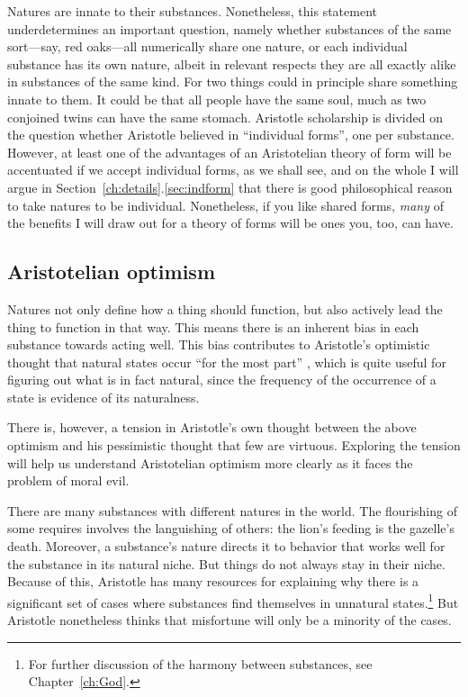Natures are innate to their substances. Nonetheless, this statement underdetermines an important question, namely whether 
substances of the same sort---say, red oaks---all numerically share one nature, or each individual substance has its own nature, 
albeit in relevant respects they are all exactly alike in substances of the same kind. For two things could in
principle share something innate to them. It could be that all people have the same soul, much as two conjoined twins can
have the same stomach. Aristotle scholarship is divided on the question whether Aristotle believed in ``individual forms'',
one per substance. However, at least one of the advantages of an Aristotelian theory of form will be accentuated if we accept 
individual forms, as we shall see, and on the whole I will argue in Section~\ref{ch:details}.\ref{sec:indform} that there is good
philosophical reason to take natures to be individual.
Nonetheless, if you like shared forms, 
\textit{many} of the benefits I will draw out for a theory of forms will be ones you, too, can have. 

\subsection{Aristotelian optimism}
Natures not only define how a thing should function, but also actively lead the thing to function in that way.
This means there is an inherent bias in each substance towards acting well. This bias contributes to Aristotle's
optimistic thought that natural states occur ``for the most part'' \parencite[\textit{Parts of Animals}, III.2]{Aristotle}, which is quite useful for figuring out
what is in fact natural, since the frequency of the occurrence of a state is evidence of its naturalness.

There is, however, a tension in Aristotle's own thought between the above optimism and his pessimistic thought that
few are virtuous. Exploring the tension will help us understand Aristotelian optimism more clearly as it faces the
problem of moral evil.

There are many substances with different natures in the world. The flourishing of some requires involves the languishing
of others: the lion's feeding is the gazelle's death. Moreover, a substance's nature directs it to behavior that works
well for the substance in its natural niche. But things do not always stay in their niche. Because of this, Aristotle
has many resources for explaining why there is a significant set of cases where substances find themselves in unnatural
states.\footnote{For further discussion of the harmony between substances, see Chapter~\ref{ch:God}.} But Aristotle nonetheless
thinks that misfortune will only be a minority of the cases.

